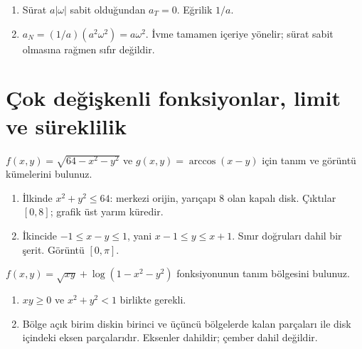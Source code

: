 \begin{tcolorbox}[title={Adım adım çözüm},colback=green!3!white,colframe=green]\begin{enumerate}
\item Sürat \(a|\omega|\) sabit olduğundan \(a_T=0\). Eğrilik \(1/a\).
\item \(a_N=(1/a)(a^2\omega^2)=a\omega^2\). İvme tamamen içeriye yönelir; sürat sabit olmasına rağmen sıfır değildir.
\end{enumerate}\end{tcolorbox}
\clearpage\section{Çok değişkenli fonksiyonlar, limit ve süreklilik}
\begin{tcolorbox}[title={Örnek 4.1 | Disk ve eğik şerit},colframe=accent]\(f(x,y)=\sqrt{64-x^2-y^2}\) ve \(g(x,y)=\arccos(x-y)\) için tanım ve görüntü kümelerini bulunuz.
\par{}\end{tcolorbox}
\begin{tcolorbox}[title={Adım adım çözüm},colback=green!3!white,colframe=green]\begin{enumerate}
\item İlkinde \(x^2+y^2\le64\): merkezi orijin, yarıçapı 8 olan kapalı disk. Çıktılar \([0,8]\); grafik üst yarım küredir.
\item İkincide \(-1\le x-y\le1\), yani \(x-1\le y\le x+1\). Sınır doğruları dahil bir şerit. Görüntü \([0,\pi]\).
\end{enumerate}\end{tcolorbox}
\begin{tcolorbox}[title={Örnek 4.2 | Kök ve logaritmayı birlikte ele almak},colframe=accent]\(f(x,y)=\sqrt{xy}+\log(1-x^2-y^2)\) fonksiyonunun tanım bölgesini bulunuz.
\par{}\end{tcolorbox}
\begin{tcolorbox}[title={Adım adım çözüm},colback=green!3!white,colframe=green]\begin{enumerate}
\item \(xy\ge0\) ve \(x^2+y^2<1\) birlikte gerekli.
\item Bölge açık birim diskin birinci ve üçüncü bölgelerde kalan parçaları ile disk içindeki eksen parçalarıdır. Eksenler dahildir; çember dahil değildir.
\end{enumerate}\end{tcolorbox}
